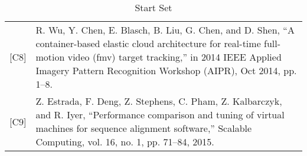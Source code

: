 \begin{table}[]
\begin{tabular}{lp{13cm}}
{[}C8{]}  & R. Wu, Y. Chen, E. Blasch, B. Liu, G. Chen, and D. Shen, “A container-based elastic cloud architecture for real-time full-motion video (fmv) target tracking,” in 2014 IEEE Applied Imagery Pattern Recognition Workshop (AIPR), Oct 2014, pp. 1–8.                                                                                  \\
{[}C9{]} & Z. Estrada, F. Deng, Z. Stephens, C. Pham, Z. Kalbarczyk, and R. Iyer, “Performance comparison and tuning of virtual machines for sequence alignment software,” Scalable Computing, vol. 16, no. 1, pp. 71–84, 2015.                                                                                                              
\end{tabular}
\centering
\caption{Start Set}
\label{lr-startset}
\end{table}


